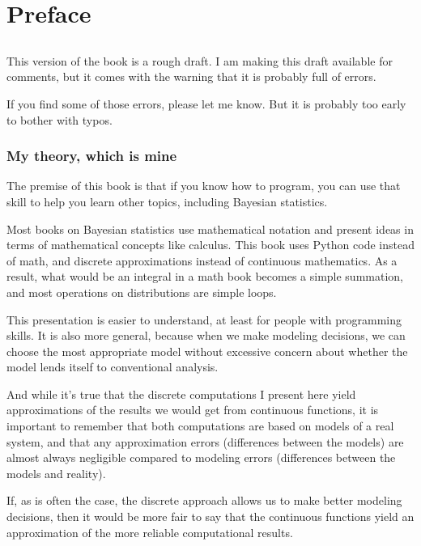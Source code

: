 \documentclass[12pt]{book}
\begin{document}
\fi

\chapter{Preface}
\label{preface}

\section*{}

This version of the book is a rough draft.  I am making this draft
available for comments, but it comes with the warning that it is
probably full of errors.

If you find some of those errors, please let me know.  But it is
probably too early to bother with typos.

\subsection*{My theory, which is mine}

The premise of this book is that if you know how to program, you
can use that skill to help you learn other topics, including
Bayesian statistics.

Most books on Bayesian statistics use mathematical notation and
present ideas in terms of mathematical concepts like calculus.
This book uses Python code instead of math, and discrete approximations
instead of continuous mathematics.  As a result, what would
be an integral in a math book becomes a simple summation, and
most operations on distributions are simple loops.

This presentation is easier to understand, at least for people with
programming skills.  It is also more general, because when we make
modeling decisions, we can choose the most appropriate model without
excessive concern about whether the model lends itself to conventional
analysis.

And while it's true that the discrete computations I present here
yield approximations of the results we would get from continuous
functions, it is important to remember that both computations are
based on models of a real system, and that any approximation errors
(differences between the models) are almost always negligible compared
to modeling errors (differences between the models and reality).

If, as is often the case, the discrete approach allows us to make
better modeling decisions, then it would be more fair to say that
the continuous functions yield an approximation of the
more reliable computational results.
\end{document}
